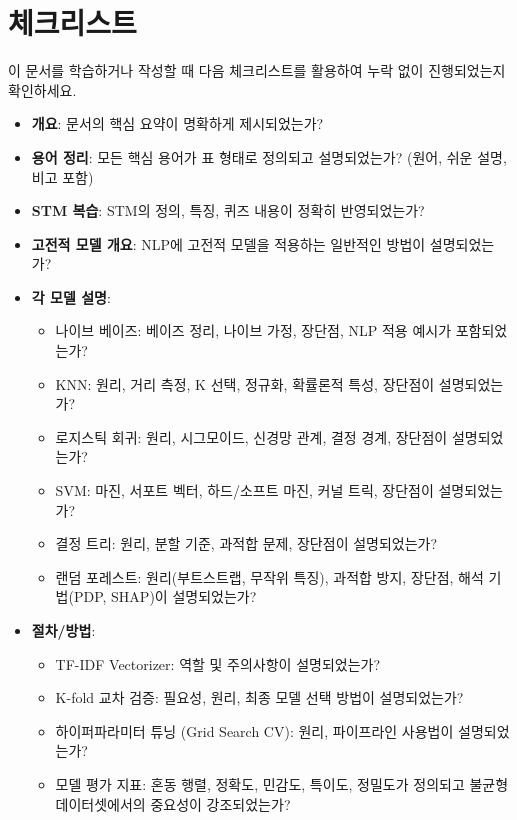 \documentclass[11pt,a4paper]{article}
\begin{document}
\newpage
\section*{체크리스트}

이 문서를 학습하거나 작성할 때 다음 체크리스트를 활용하여 누락 없이 진행되었는지 확인하세요.

\begin{tcolorbox}[title=\textbf{학습/작성/검토 체크리스트}, colback=myblue!10, colframe=blue!75!black, boxrule=0.8pt, arc=4pt]
\begin{itemize}
    \item \textbf{개요}: 문서의 핵심 요약이 명확하게 제시되었는가?
    \item \textbf{용어 정리}: 모든 핵심 용어가 표 형태로 정의되고 설명되었는가? (원어, 쉬운 설명, 비고 포함)
    \item \textbf{STM 복습}: STM의 정의, 특징, 퀴즈 내용이 정확히 반영되었는가?
    \item \textbf{고전적 모델 개요}: NLP에 고전적 모델을 적용하는 일반적인 방법이 설명되었는가?
    \item \textbf{각 모델 설명}:
    \begin{itemize}
        \item 나이브 베이즈: 베이즈 정리, 나이브 가정, 장단점, NLP 적용 예시가 포함되었는가?
        \item KNN: 원리, 거리 측정, K 선택, 정규화, 확률론적 특성, 장단점이 설명되었는가?
        \item 로지스틱 회귀: 원리, 시그모이드, 신경망 관계, 결정 경계, 장단점이 설명되었는가?
        \item SVM: 마진, 서포트 벡터, 하드/소프트 마진, 커널 트릭, 장단점이 설명되었는가?
        \item 결정 트리: 원리, 분할 기준, 과적합 문제, 장단점이 설명되었는가?
        \item 랜덤 포레스트: 원리(부트스트랩, 무작위 특징), 과적합 방지, 장단점, 해석 기법(PDP, SHAP)이 설명되었는가?
    \end{itemize}
    \item \textbf{절차/방법}:
    \begin{itemize}
        \item TF-IDF Vectorizer: 역할 및 주의사항이 설명되었는가?
        \item K-fold 교차 검증: 필요성, 원리, 최종 모델 선택 방법이 설명되었는가?
        \item 하이퍼파라미터 튜닝 (Grid Search CV): 원리, 파이프라인 사용법이 설명되었는가?
        \item 모델 평가 지표: 혼동 행렬, 정확도, 민감도, 특이도, 정밀도가 정의되고 불균형 데이터셋에서의 중요성이 강조되었는가?

\end{itemize}
\end{itemize}
\end{tcolorbox}
\end{document}
